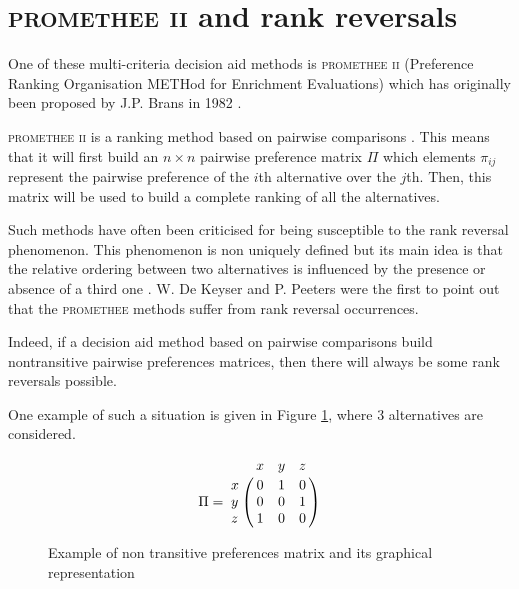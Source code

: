 \documentclass[conference,compsoc]{IEEEtran}
\begin{document}
\section{\textsc{promethee ii} and rank reversals}
One of these multi-criteria decision aid methods is \textsc{promethee ii} (Preference Ranking Organisation METHod for Enrichment Evaluations) which has originally been proposed by J.P. Brans in 1982 \cite{Bra1982}.

\textsc{promethee ii} is a ranking method based on pairwise comparisons \cite{mareschal2008rank}. This means that it will first build an $n \times n$ pairwise preference matrix $\Pi$ which elements $\pi_{ij}$ represent the pairwise preference of the $i$th alternative over the $j$th. Then, this matrix will be used to build a complete ranking of all the alternatives.

Such methods have often been criticised for being susceptible to the rank reversal phenomenon. This phenomenon is non uniquely defined but its main idea is that the relative ordering between two alternatives is influenced by the presence or absence of a third one \cite{Brans2016}.
W. De Keyser and P. Peeters \cite{de1996note} were the first to point out that the \textsc{promethee} methods suffer from rank reversal occurrences.

Indeed, if a decision aid method based on pairwise comparisons build nontransitive pairwise preferences matrices, then there will always be some rank reversals possible.

One example of such a situation is given in Figure \ref{fig:untransitive_pref_example}, where 3 alternatives are considered.
\begin{figure}[h]
\begin{minipage}{.2\textwidth}
    \begin{equation*}
        \Pi   = \bordermatrix{~ & x    & y    & z   \cr
                            x & 0    & 1    & 0   \cr
                            y & 0    & 0    & 1   \cr
                            z & 1    & 0    & 0   \cr}
    \end{equation*}
\end{minipage}
\begin{minipage}{.2\textwidth}
    \begin{center}
   \end{center}
\end{minipage}%
\caption{Example of non transitive preferences matrix and its graphical representation} \label{fig:untransitive_matrix}
\label{fig:untransitive_pref_example}
\end{figure}
\end{document}
